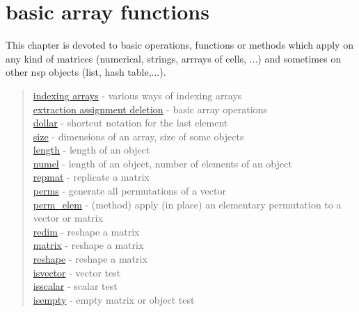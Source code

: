 \chapter*{basic array functions}

This chapter is devoted to basic operations, functions or methods which apply on
any kind of matrices (numerical, strings, arrrays of cells, ...) and sometimes
on other nsp objects (list, hash table,...).

\begin{quote}
\noindent
\hyperlink{indexing arrays}{indexing arrays} - various ways of indexing arrays \\
\hyperlink{extraction assignment deletion}{extraction assignment deletion} - basic array operations\\
\hyperlink{dollar}{dollar} - shortcut notation for the last element\\
\hyperlink{size}{size} - dimensions of an array, size of some objects \\
\hyperlink{length}{length} - length of an object  \\
\hyperlink{numel}{numel} - length of an object, number of elements of an object  \\
\hyperlink{repmat}{repmat} - replicate a matrix\\
\hyperlink{perms}{perms} - generate all permutations of a vector\\
\hyperlink{perm_elem}{perm\_elem} - (method) apply (in place) an elementary permutation to a vector or matrix \\
\hyperlink{redim}{redim} - reshape a matrix\\
\hyperlink{matrix}{matrix} - reshape a matrix\\
\hyperlink{reshape}{reshape} - reshape a matrix\\
\hyperlink{isvector}{isvector} - vector test\\
\hyperlink{isscalar}{isscalar} - scalar test\\
\hyperlink{isempty}{isempty} - empty matrix or object test\\
\end{quote}









